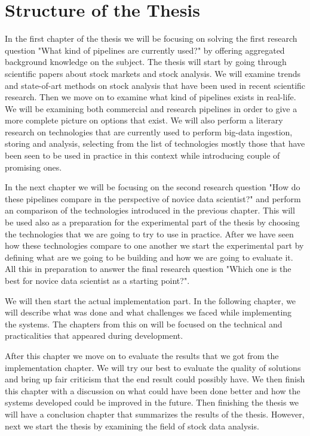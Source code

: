 \section{Structure of the Thesis}

In the first chapter of the thesis we will be focusing on solving the first research question "What kind of pipelines are currently used?" by offering aggregated background knowledge on the subject.
The thesis will start by going through scientific papers about stock markets and stock analysis.
We will examine trends and state-of-art methods on stock analysis that have been used in recent scientific research.
Then we move on to examine what kind of pipelines exists in real-life.
We will be examining both commercial and research pipelines in order to give a more complete picture on options that exist.
We will also perform a literary research on technologies that are currently used to perform big-data ingestion, storing and analysis, selecting from the list of technologies mostly those that have been seen to be used in practice in this context while introducing couple of promising ones.

In the next chapter we will be focusing on the second research question "How do these pipelines compare in the perspective of novice data scientist?" and perform an comparison of the technologies introduced in the previous chapter.
This will be used also as a preparation for the experimental part of the thesis by choosing the technologies that we are going to try to use in practice.
After we have seen how these technologies compare to one another we start the experimental part by defining what are we going to be building and how we are going to evaluate it.
All this in preparation to answer the final research question "Which one is the best for novice data scientist as a starting point?".

We will then start the actual implementation part.
In the following chapter, we will describe what was done and what challenges we faced while implementing the systems.
The chapters from this on will be focused on the technical and practicalities that appeared during development.

After this chapter we move on to evaluate the results that we got from the implementation chapter. 
We will try our best to evaluate the quality of solutions and bring up fair criticism that the end result could possibly have.
We then finish this chapter with a discussion on what could have been done better and how the systems developed could be improved in the future.
Then finishing the thesis we will have a conclusion chapter that summarizes the results of the thesis.
However, next we start the thesis by examining the field of stock data analysis.
